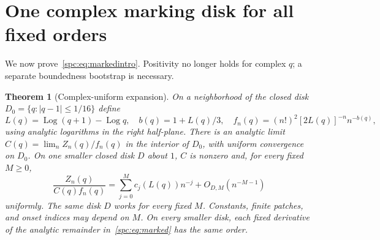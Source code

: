 \documentclass[11pt,letterpaper]{article}
\newtheorem{theorem}{Theorem}[section]
\theoremstyle{definition}\newtheorem{definition}[theorem]{Definition}
\theoremstyle{remark}\newtheorem{remark}[theorem]{Remark}
\newcommand{\Log}{\operatorname{Log}}
\begin{document}
\section{One complex marking disk for all fixed orders}\label{spc:sec:marked}
We now prove~\eqref{spc:eq:markedintro}. Positivity no longer holds for complex $q$; a separate boundedness bootstrap is necessary.
\begin{theorem}[Complex-uniform expansion]\label{spc:thm:marked}
On a neighborhood of the closed disk $D_0=\{q:|q-1|\le1/16\}$ define
\[
 L(q)=\Log(q+1)-\Log q,\quad b(q)=1+L(q)/3,\quad
 f_n(q)=(n!)^2[2L(q)]^{-n}n^{-b(q)},
\]
using analytic logarithms in the right half-plane. There is an analytic limit
$C(q)=\lim_n Z_n(q)/f_n(q)$ in the interior of $D_0$, with uniform convergence on $D_0$. On one smaller closed disk $D$ about $1$, $C$ is nonzero and, for every fixed $M\ge0$,
\begin{equation}\label{spc:eq:marked}
 \frac{Z_n(q)}{C(q)f_n(q)}
   =\sum_{j=0}^M c_j(L(q))n^{-j}+O_{D,M}(n^{-M-1})
\end{equation}
uniformly. The same disk $D$ works for every fixed $M$. Constants, finite patches, and onset indices may depend on $M$. On every smaller disk, each fixed derivative of the analytic remainder in~\eqref{spc:eq:marked} has the same order.
\end{theorem}
\end{document}
